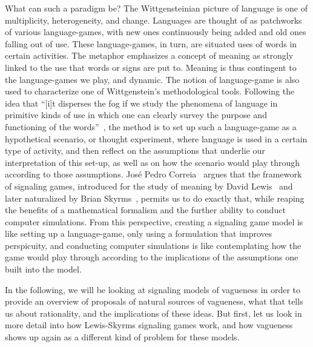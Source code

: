 \documentclass[a4paper]{article}
\begin{document}
What can such a paradigm be?
The Wittgensteinian picture of language is one of multiplicity, heterogeneity, and change.
Languages are thought of as patchworks of various language-games, with new ones continuously being added and old ones falling out of use.
These language-games, in turn, are situated uses of words in certain activities.
The metaphor emphasizes a concept of meaning as strongly linked to the use that words or signs are put to.
Meaning is thus contingent to the language-games we play, and dynamic.
The notion of language-game is also used to characterize one of Wittgenstein's methodological tools.
Following the idea that ``[i]t disperses the fog if we study the phenomena of language in primitive kinds of use in which one can clearly survey the purpose and functioning of the words''~\parencite*[\S 5]{wittgenstein_philosophical_1953}, the method is to set up such a language-game as a hypothetical scenario, or thought experiment, where language is used in a certain type of activity, and then reflect on the assumptions that underlie our interpretation of this set-up, as well as on how the scenario would play through according to those assumptions.
Jos\'e Pedro Correia~\parencite*{correia_bivalent_2013} argues that the framework of signaling games, introduced for the study of meaning by David Lewis~\parencite*{lewis_convention_1969} and later naturalized by Brian Skyrms~\parencite*{skyrms_evolution_1996,skyrms_signals_2010}, permits us to do exactly that, while reaping the benefits of a mathematical formalism and the further ability to conduct computer simulations.
From this perspective, creating a signaling game model is like setting up a language-game, only using a formulation that improves perspicuity, and conducting computer simulations is like contemplating how the game would play through according to the implications of the assumptions one built into the model.

In the following, we will be looking at signaling models of vagueness in order to provide an overview of proposals of natural sources of vagueness, what that tells us about rationality, and the implications of these ideas.
But first, let us look in more detail into how Lewis-Skyrms signaling games work, and how vagueness shows up again as a different kind of problem for these models.
\end{document}
